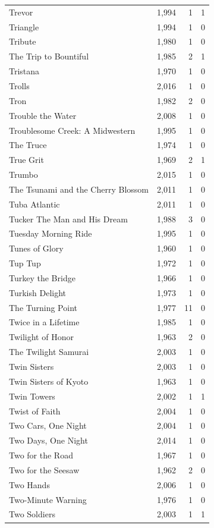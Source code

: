 \begin{tabular}{lrrr}
Trevor & 1,994 & 1 & 1 \\
Triangle & 1,994 & 1 & 0 \\
Tribute & 1,980 & 1 & 0 \\
The Trip to Bountiful & 1,985 & 2 & 1 \\
Tristana & 1,970 & 1 & 0 \\
Trolls & 2,016 & 1 & 0 \\
Tron & 1,982 & 2 & 0 \\
Trouble the Water & 2,008 & 1 & 0 \\
Troublesome Creek: A Midwestern & 1,995 & 1 & 0 \\
The Truce & 1,974 & 1 & 0 \\
True Grit & 1,969 & 2 & 1 \\
Trumbo & 2,015 & 1 & 0 \\
The Tsunami and the Cherry Blossom & 2,011 & 1 & 0 \\
Tuba Atlantic & 2,011 & 1 & 0 \\
Tucker The Man and His Dream & 1,988 & 3 & 0 \\
Tuesday Morning Ride & 1,995 & 1 & 0 \\
Tunes of Glory & 1,960 & 1 & 0 \\
Tup Tup & 1,972 & 1 & 0 \\
Turkey the Bridge & 1,966 & 1 & 0 \\
Turkish Delight & 1,973 & 1 & 0 \\
The Turning Point & 1,977 & 11 & 0 \\
Twice in a Lifetime & 1,985 & 1 & 0 \\
Twilight of Honor & 1,963 & 2 & 0 \\
The Twilight Samurai & 2,003 & 1 & 0 \\
Twin Sisters & 2,003 & 1 & 0 \\
Twin Sisters of Kyoto & 1,963 & 1 & 0 \\
Twin Towers & 2,002 & 1 & 1 \\
Twist of Faith & 2,004 & 1 & 0 \\
Two Cars, One Night & 2,004 & 1 & 0 \\
Two Days, One Night & 2,014 & 1 & 0 \\
Two for the Road & 1,967 & 1 & 0 \\
Two for the Seesaw & 1,962 & 2 & 0 \\
Two Hands & 2,006 & 1 & 0 \\
Two-Minute Warning & 1,976 & 1 & 0 \\
Two Soldiers & 2,003 & 1 & 1 \\

\end{tabular}
